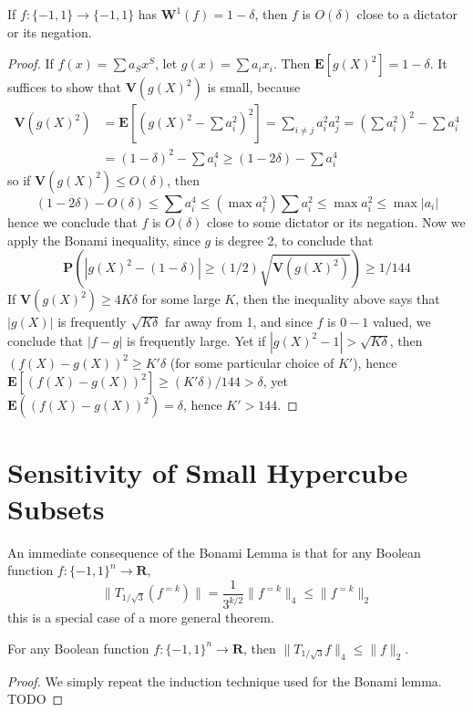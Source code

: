 \begin{theorem}
    If $f: \{ -1, 1 \} \to \{ -1, 1 \}$ has $\mathbf{W}^1(f) = 1 - \delta$, then $f$ is $O(\delta)$ close to a dictator or its negation.
\end{theorem}
\begin{proof}
    If $f(x) = \sum a_S x^S$, let $g(x) = \sum a_i x_i$. Then $\mathbf{E}[g(X)^2] = 1 - \delta$. It suffices to show that $\mathbf{V}(g(X)^2)$ is small, because
    \begin{align*}
        \mathbf{V}(g(X)^2) &= \mathbf{E} \left[ \left(g(X)^2 - \sum a_i^2 \right)^2 \right] = \sum_{i \neq j} a_i^2 a_j^2 = \left( \sum a_i^2 \right)^2 - \sum a_i^4\\
        &= (1 - \delta)^2 - \sum a_i^4 \geq (1 - 2\delta) - \sum a_i^4
    \end{align*}
    so if $\mathbf{V}(g(X)^2) \leq O(\delta)$, then
    \[ (1 - 2\delta) - O(\delta) \leq \sum a_i^4 \leq \left( \max a_i^2 \right) \sum a_i^2 \leq \max a_i^2 \leq \max |a_i| \]
    hence we conclude that $f$ is $O(\delta)$ close to some dictator or its negation. Now we apply the Bonami inequality, since $g$ is degree 2, to conclude that
    \[ \mathbf{P} \left( |g(X)^2 - (1 - \delta)| \geq (1/2) \sqrt{\mathbf{V}(g(X)^2)} \right) \geq 1/144 \]
    If $\mathbf{V}(g(X)^2) \geq 4K \delta$ for some large $K$, then the inequality above says that $|g(X)|$ is frequently $\sqrt{K \delta}$ far away from 1, and since $f$ is $0-1$ valued, we conclude that $|f - g|$ is frequently large. Yet if $|g(X)^2 - 1| > \sqrt{K\delta}$, then $(f(X) - g(X))^2 \geq K' \delta$ (for some particular choice of $K'$), hence $\mathbf{E}[(f(X) - g(X))^2] \geq (K' \delta)/144 > \delta$, yet $\mathbf{E}((f(X) - g(X))^2) = \delta$, hence $K' > 144$.
\end{proof}

\section{Sensitivity of Small Hypercube Subsets}

An immediate consequence of the Bonami Lemma is that for any Boolean function $f: \{ -1, 1 \}^n \to \mathbf{R}$,
%
\[ \| T_{1/\sqrt{3}} (f^{=k}) \| = \frac{1}{3^{k/2}} \| f^{=k} \|_4 \leq \| f^{=k} \|_2 \]
%
this is a special case of a more general theorem.

\begin{theorem}
    For any Boolean function $f: \{ -1, 1 \}^n \to \mathbf{R}$, then $\| T_{1/\sqrt{3}} f \|_4 \leq \| f \|_2$.
\end{theorem}
\begin{proof}
    We simply repeat the induction technique used for the Bonami lemma. TODO
\end{proof}

